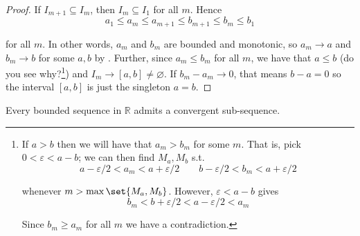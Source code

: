 \documentclass{article}
\begin{document}
\begin{proof}
  If $I_{m + 1} \subseteq I_m$, then $I_{m} \subseteq I_1$ for all $m$. Hence
  \[
    a_1 \le a_m \le a_{m + 1} \le b_{m + 1} \le b_m \le b_1
  \]

  for all $m$. In other words, $a_m$ and $b_m$ are bounded and monotonic, so $a_m \to a$ and $b_m \to b$ for some $a, b$ by . Further, since $a_m \le b_m$ for all $m$, we have that $a \le b$ (do you see why?\footnote{If $a > b$ then we will have that $a_m > b_m$ for some $m$. That is, pick $0 < \varepsilon < a - b$; we can then find $M_a, M_b$ s.t.
    \[
      a - \varepsilon / 2 < a_m < a + \varepsilon / 2
      \quad\quad
      b - \varepsilon / 2 < b_m < a + \varepsilon / 2
    \]

    whenever $m > \max\set{M_a, M_b}$. However, $\varepsilon < a - b$ gives
    \[
      b_m < b + \varepsilon / 2 < a - \varepsilon / 2 < a_m
    \]

    Since $b_m \ge a_m$ for all $m$ we have a contradiction.}) and $I_m \to [a, b] \ne \varnothing$. If $b_m - a_m \to 0$, that means $b - a = 0$ so the interval $[a, b]$ is just the singleton $a = b$.
\end{proof}

\begin{theorem}
  Every bounded sequence in $\mathbb{R}$ admits a convergent sub-sequence.
\end{theorem}
\end{document}
